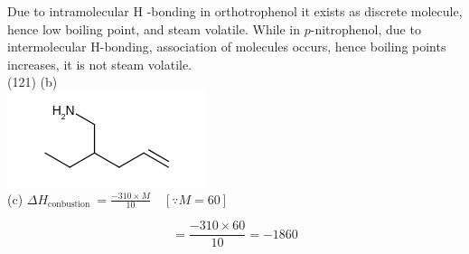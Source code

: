 \documentclass[10pt]{article}
\begin{document}
Due to intramolecular H -bonding in orthotrophenol it exists as discrete molecule, hence low boiling point, and steam volatile. While in $p$-nitrophenol, due to intermolecular H-bonding, association of molecules occurs, hence boiling points increases, it is not steam volatile.\\
(121) (b)\\
\includegraphics{smile-b074113300d9ca7119a2fdc0d0a18fe69e630e39}\\
(c) $\Delta H_{\text {conbustion }}=\frac{-310 \times M}{10} \quad[\because M=60]$

$$
=\frac{-310 \times 60}{10}=-1860
$$
\end{document}
